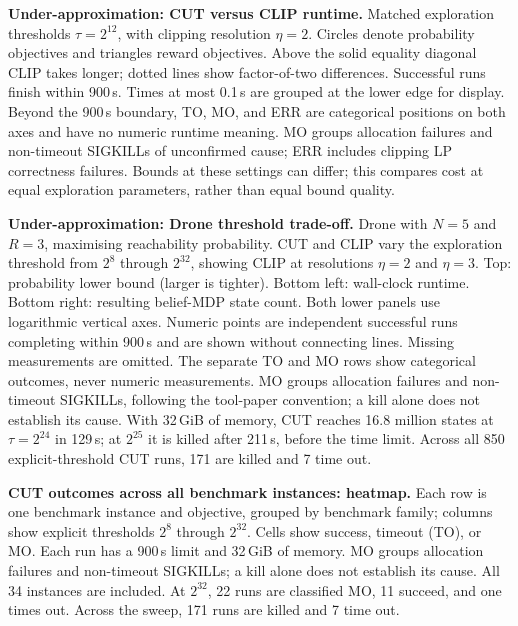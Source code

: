 \documentclass[fontsize=10pt,paper=b5,twoside,DIV=11,BCOR=9mm,
    headinclude=true,footinclude=false]{scrartcl}
\newcommand{\checkplot}[3]{%
  \par\begingroup\centering
    {\footnotesize #2}\par\medskip
    \parbox{\linewidth}{\small\textbf{#1} #3\par}%
  \endgroup\clearpage
}
\begin{document}
\checkplot{Under-approximation: CUT versus CLIP runtime.}{%
}{%
  Matched exploration thresholds $\tau=2^{12}$, with clipping resolution
  $\eta=2$. Circles denote probability objectives and triangles reward objectives.
  Above the solid equality diagonal CLIP takes longer; dotted lines show
  factor-of-two differences. Successful runs finish within 900\,s. Times at most
  0.1\,s are grouped at the lower edge for display. Beyond the 900\,s boundary,
  TO, MO, and ERR are categorical positions on both axes and have no numeric
  runtime meaning. MO groups allocation failures and non-timeout SIGKILLs
  of unconfirmed cause; ERR includes clipping LP correctness failures. Bounds at
  these settings can differ; this compares cost at equal exploration parameters,
  rather than equal bound quality.
}
\checkplot{Under-approximation: Drone threshold trade-off.}{%
}{%
  Drone with $N=5$ and $R=3$, maximising reachability probability. CUT and CLIP
  vary the exploration threshold from $2^8$ through $2^{32}$, showing CLIP at
  resolutions $\eta=2$ and $\eta=3$. Top: probability lower bound (larger is
  tighter). Bottom left: wall-clock runtime. Bottom right: resulting belief-MDP
  state count. Both lower panels use logarithmic vertical axes. Numeric points
  are independent successful runs completing within 900\,s and are shown
  without connecting lines. Missing measurements are omitted.
  The separate TO and MO rows show categorical outcomes, never numeric
  measurements. MO groups allocation failures and non-timeout SIGKILLs,
  following the tool-paper convention; a kill alone does not establish its cause.
  With 32\,GiB of memory, CUT reaches 16.8 million states at $\tau=2^{24}$
  in 129\,s; at $2^{25}$ it is killed after 211\,s, before the time limit.
  Across all 850 explicit-threshold CUT runs, 171 are killed and 7 time out.
}
\checkplot{CUT outcomes across all benchmark instances: heatmap.}{%
}{%
  Each row is one benchmark instance and objective, grouped by benchmark family;
  columns show explicit thresholds $2^8$ through $2^{32}$. Cells show success,
  timeout (TO), or MO. Each run has a 900\,s limit and 32\,GiB of memory. MO groups
  allocation failures and non-timeout SIGKILLs; a kill alone does not establish
  its cause. All 34 instances are included. At $2^{32}$, 22 runs are classified
  MO, 11 succeed, and one times out. Across the sweep, 171 runs are killed
  and 7 time out.
}
\end{document}

